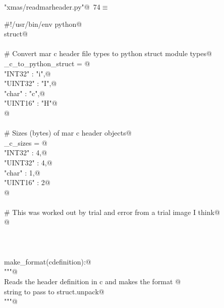 \documentclass[10pt,a4paper,twoside,notitlepage]{article}
\begin{document}
\begin{flushleft} \small
\begin{minipage}{\linewidth}\label{scrap18}\raggedright\small
{} \verb@"xmas/readmarheader.py"@\nobreak\ {\footnotesize {74}}$\equiv$
\vspace{-1ex}
\begin{list}{}{} \item
\mbox{}\verb@#!/usr/bin/env python@\\
\mbox{}\verb@import struct@\\
\mbox{}\verb@@\\
\mbox{}\verb@# Convert mar c header file types to python struct module types@\\
\mbox{}\verb@mar_c_to_python_struct = {@\\
\mbox{}\verb@    "INT32"  : "i",@\\
\mbox{}\verb@    "UINT32" : "I",@\\
\mbox{}\verb@    "char"   : "c",@\\
\mbox{}\verb@    "UINT16" : "H"@\\
\mbox{}\verb@    }@\\
\mbox{}\verb@@\\
\mbox{}\verb@# Sizes (bytes) of mar c header objects@\\
\mbox{}\verb@mar_c_sizes = {@\\
\mbox{}\verb@    "INT32"  : 4,@\\
\mbox{}\verb@    "UINT32" : 4,@\\
\mbox{}\verb@    "char"   : 1,@\\
\mbox{}\verb@    "UINT16" : 2@\\
\mbox{}\verb@    }@\\
\mbox{}\verb@@\\
\mbox{}\verb@# This was worked out by trial and error from a trial image I think@\\
\mbox{}@\\
\mbox{}\verb@@\\
\mbox{}\verb@@\\
\mbox{}\verb@@\\
\mbox{}\verb@def make_format(cdefinition):@\\
\mbox{}\verb@    """@\\
\mbox{}\verb@    Reads the header definition in c and makes the format @\\
\mbox{}\verb@    string to pass to struct.unpack@\\
\mbox{}\verb@    """@\\

\end{list}
\end{minipage}
\end{flushleft}
\end{document}
